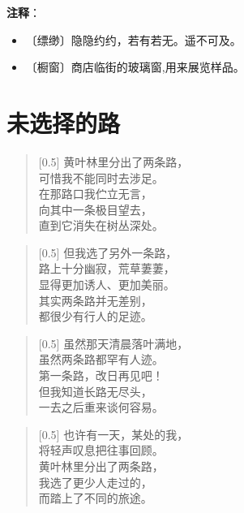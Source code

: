 \documentclass[12pt,UTF-8,openany]{ctexbook}
\begin{document}
\newpage

\textbf{注释}：

\vspace{-1em}

\begin{itemize}
    \setlength\itemsep{-0.2em}
    \item 〔缥缈〕隐隐约约，若有若无。遥不可及。
    \item 〔橱窗〕商店临街的玻璃窗,用来展览样品。
\end{itemize}

\chapter{未选择的路}

\begin{normalsize}
    
    \begin{verse}[0.5\linewidth]
        黄叶林里分出了两条路， \\
        可惜我不能同时去涉足。 \\
        在那路口我伫立无言， \\
        向其中一条极目望去， \\
        直到它消失在树丛深处。
    \end{verse}
    
    
    \begin{verse}[0.5\linewidth]
        但我选了另外一条路， \\
        路上十分幽寂，荒草萋萋， \\
        显得更加诱人、更加美丽。 \\
        其实两条路并无差别， \\
        都很少有行人的足迹。
    \end{verse}
    
    
    \begin{verse}[0.5\linewidth]
        虽然那天清晨落叶满地， \\
        虽然两条路都罕有人迹。 \\
        第一条路，改日再见吧！ \\
        但我知道长路无尽头， \\
        一去之后重来谈何容易。
    \end{verse}
    
    
    \begin{verse}[0.5\linewidth]
        也许有一天，某处的我， \\
        将轻声叹息把往事回顾。 \\
        黄叶林里分出了两条路， \\
        我选了更少人走过的， \\
        而踏上了不同的旅途。
    \end{verse}
    
\end{normalsize}
\end{document}
